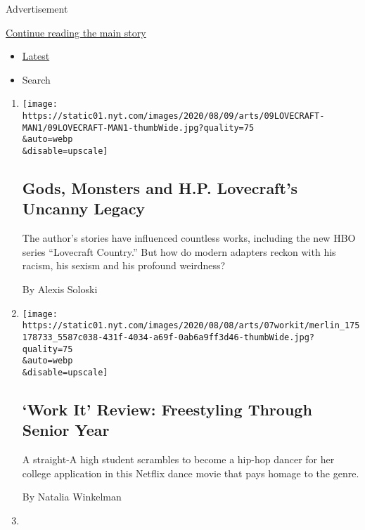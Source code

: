 Advertisement

\protect\hyperlink{after-mid1}{Continue reading the main story}

\begin{itemize}
\tightlist
\item
  \protect\hyperlink{stream-panel}{Latest}
\item
  Search
\end{itemize}

\begin{enumerate}
\def\labelenumi{\arabic{enumi}.}
\item
  \href{/2020/08/07/arts/television/hp-lovecraft.html}{}

  \texttt{[image: https://static01.nyt.com/images/2020/08/09/arts/09LOVECRAFT-MAN1/09LOVECRAFT-MAN1-thumbWide.jpg?quality=75\\\&auto=webp\\\&disable=upscale]}

  \hypertarget{gods-monsters-and-hp-lovecrafts-uncanny-legacy}{%
  \subsection{Gods, Monsters and H.P. Lovecraft's Uncanny
  Legacy}\label{gods-monsters-and-hp-lovecrafts-uncanny-legacy}}

  The author's stories have influenced countless works, including the
  new HBO series ``Lovecraft Country.'' But how do modern adapters
  reckon with his racism, his sexism and his profound weirdness?

  By Alexis Soloski
\item
  \href{/2020/08/07/movies/work-it-review-netflix.html}{}

  \texttt{[image: https://static01.nyt.com/images/2020/08/08/arts/07workit/merlin\_175178733\_5587c038-431f-4034-a69f-0ab6a9ff3d46-thumbWide.jpg?quality=75\\\&auto=webp\\\&disable=upscale]}

  \hypertarget{work-it-review-freestyling-through-senior-year}{%
  \subsection{`Work It' Review: Freestyling Through Senior
  Year}\label{work-it-review-freestyling-through-senior-year}}

  A straight-A high student scrambles to become a hip-hop dancer for her
  college application in this Netflix dance movie that pays homage to
  the genre.

  By Natalia Winkelman
\item
  \href{/2020/08/06/arts/things-to-do-weekend-coronavirus.html}{}


\end{enumerate}
